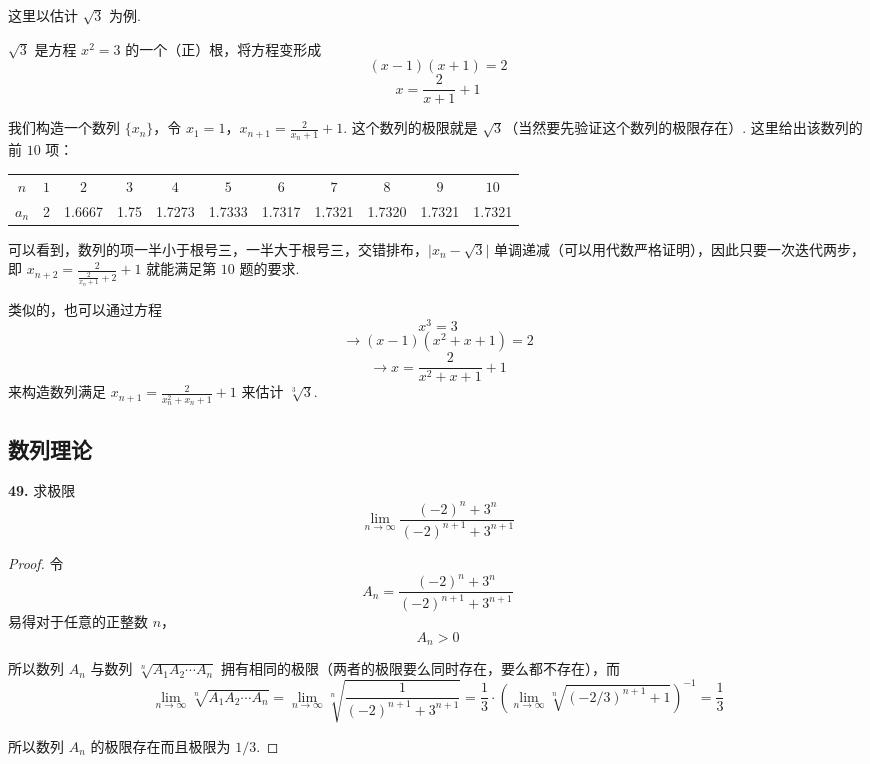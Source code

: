 这里以估计 $\sqrt{3}$ 为例.

$\sqrt{3}$ 是方程 $x^2 = 3$ 的一个（正）根，将方程变形成
\[(x-1)(x+1) = 2\]
\[x = \frac{2}{x+1}+1\]

我们构造一个数列 $\{x_n\}$，令 $x_1 = 1$，$\displaystyle x_{n+1} = \frac{2}{x_n+1}+1$. 这个数列的极限就是 $\sqrt{3}$（当然要先验证这个数列的极限存在）. 这里给出该数列的前 $10$ 项：

\begin{center}
    \begin{tabular}{c|cccccccccc}
        \hline
        $n$ & $1$ & $2$ & $3$ & $4$ & $5$ & $6$ & $7$ & $8$ & $9$ & $10$\\
        $a_n$ & 2 & 1.6667 & 1.75 & 1.7273 & 1.7333 & 1.7317 & 1.7321 & 1.7320 & 1.7321 & 1.7321\\
        \hline
    \end{tabular}
\end{center}

可以看到，数列的项一半小于根号三，一半大于根号三，交错排布，$\lvert x_n - \sqrt{3}\rvert$ 单调递减（可以用代数严格证明），因此只要一次迭代两步，即 $\displaystyle x_{n+2} = \frac{2}{\frac{2}{x_n+1}+2}+1$ 就能满足第 $10$ 题的要求.

类似的，也可以通过方程
\[x^3 = 3\]
\[\rightarrow (x-1)(x^2+x+1) = 2\]
\[\rightarrow x = \frac{2}{x^2+x+1}+1\]
来构造数列满足 $\displaystyle x_{n+1} = \frac{2}{x_n^2+x_n+1}+1$ 来估计 $\sqrt[3]{3}$.

\subsection{数列理论}
\textbf{49.} 求极限
\[\lim_{n \rightarrow \infty} \frac{(-2)^n + 3^n}{(-2)^{n+1} + 3^{n+1}} \tag{49.1}\]
\begin{proof}
    令
    \[A_n = \frac{(-2)^n + 3^n}{(-2)^{n+1} + 3^{n+1}} \tag{49.2}\]
    易得对于任意的正整数 $n$，
    \[A_n > 0\]

    所以数列 $A_n$ 与数列 $\sqrt[n]{A_1A_2 \cdots A_n}$ 拥有相同的极限（两者的极限要么同时存在，要么都不存在），而
    \[\lim_{n \rightarrow \infty} \sqrt[n]{A_1 A_2 \cdots A_n} = \lim_{n \rightarrow \infty} \sqrt[n]{\frac{1}{(-2)^{n+1} + 3^{n+1}}} = \frac{1}{3} \cdot \left(\lim_{n \rightarrow \infty} \sqrt[n]{(-2/3)^{n+1} + 1}\right)^{-1} = \frac{1}{3} \tag{49.3}\]

    所以数列 $A_n$ 的极限存在而且极限为 $1/3$.
\end{proof}\vspace{9pt}


